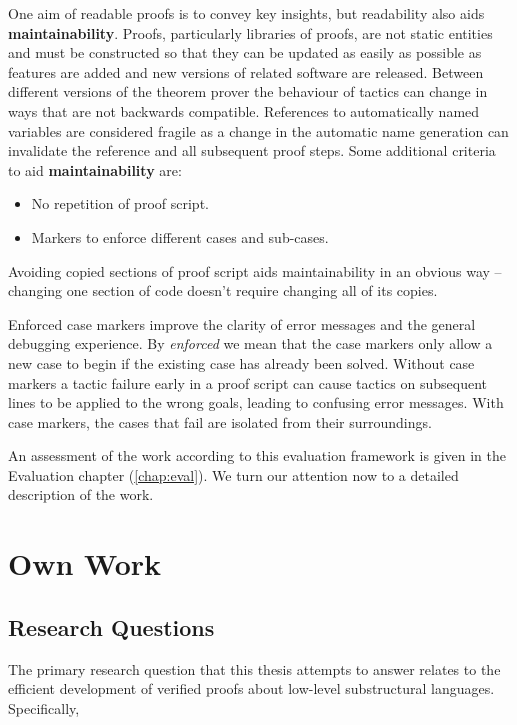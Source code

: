 \documentclass[]{unswthesis}
\let\i\textit
\let\b\textbf
\begin{document}
One aim of readable proofs is to convey key insights, but readability also aids \b{maintainability}. Proofs, particularly libraries of proofs, are not static entities and must be constructed so that they can be updated as easily as possible as features are added and new versions of related software are released. Between different versions of the theorem prover the behaviour of tactics can change in ways that are not backwards compatible. References to automatically named variables are considered fragile as a change in the automatic name generation can invalidate the reference and all subsequent proof steps. Some additional criteria to aid \b{maintainability} are:

\begin{itemize}
\item No repetition of proof script.
\item Markers to enforce different cases and sub-cases.
\end{itemize}

Avoiding copied sections of proof script aids maintainability in an obvious way -- changing one section of code doesn't require changing all of its copies.

Enforced case markers improve the clarity of error messages and the general debugging experience. By \i{enforced} we mean that the case markers only allow a new case to begin if the existing case has already been solved. Without case markers a tactic failure early in a proof script can cause tactics on subsequent lines to be applied to the wrong goals, leading to confusing error messages. With case markers, the cases that fail are isolated from their surroundings.

An assessment of the work according to this evaluation framework is given in the Evaluation chapter (\cref{chap:eval}). We turn our attention now to a detailed description of the work.

\chapter{Own Work}

\section{Research Questions}

The primary research question that this thesis attempts to answer relates to the efficient development of verified proofs about low-level substructural languages. Specifically,
\end{document}
